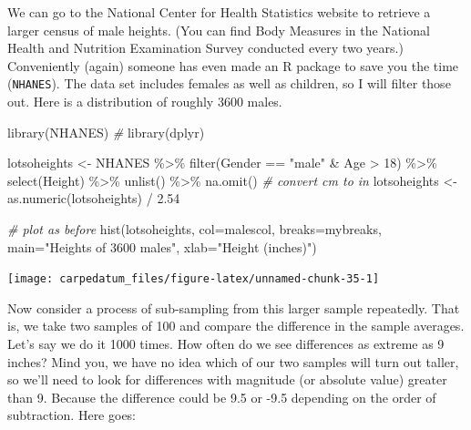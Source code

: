 \documentclass[
  openany]{book}
\newenvironment{Shaded}{\begin{snugshade}}{\end{snugshade}}
\newcommand{\AttributeTok}[1]{\textcolor[rgb]{0.77,0.63,0.00}{#1}}
\newcommand{\CommentTok}[1]{\textcolor[rgb]{0.56,0.35,0.01}{\textit{#1}}}
\newcommand{\DecValTok}[1]{\textcolor[rgb]{0.00,0.00,0.81}{#1}}
\newcommand{\FloatTok}[1]{\textcolor[rgb]{0.00,0.00,0.81}{#1}}
\newcommand{\FunctionTok}[1]{\textcolor[rgb]{0.00,0.00,0.00}{#1}}
\newcommand{\NormalTok}[1]{#1}
\newcommand{\OtherTok}[1]{\textcolor[rgb]{0.56,0.35,0.01}{#1}}
\newcommand{\SpecialCharTok}[1]{\textcolor[rgb]{0.00,0.00,0.00}{#1}}
\newcommand{\StringTok}[1]{\textcolor[rgb]{0.31,0.60,0.02}{#1}}
\begin{document}
We can go to the National Center for Health Statistics website to retrieve a larger census of male heights. (You can find Body Measures in the National Health and Nutrition Examination Survey conducted every two years.) Conveniently (again) someone has even made an R package to save you the time (\texttt{NHANES}). The data set includes females as well as children, so I will filter those out. Here is a distribution of roughly 3600 males.

\begin{Shaded}
\begin{Highlighting}[]
\FunctionTok{library}\NormalTok{(NHANES) }\CommentTok{\#}
\FunctionTok{library}\NormalTok{(dplyr)}

\NormalTok{lotsoheights }\OtherTok{\textless{}{-}}\NormalTok{ NHANES }\SpecialCharTok{\%\textgreater{}\%} \FunctionTok{filter}\NormalTok{(Gender }\SpecialCharTok{==} \StringTok{"male"} \SpecialCharTok{\&}\NormalTok{ Age }\SpecialCharTok{\textgreater{}} \DecValTok{18}\NormalTok{) }\SpecialCharTok{\%\textgreater{}\%} 
                                \FunctionTok{select}\NormalTok{(Height) }\SpecialCharTok{\%\textgreater{}\%} \FunctionTok{unlist}\NormalTok{() }\SpecialCharTok{\%\textgreater{}\%} \FunctionTok{na.omit}\NormalTok{()}
\CommentTok{\# convert cm to in}
\NormalTok{lotsoheights }\OtherTok{\textless{}{-}} \FunctionTok{as.numeric}\NormalTok{(lotsoheights) }\SpecialCharTok{/} \FloatTok{2.54}

\CommentTok{\# plot as before}
\FunctionTok{hist}\NormalTok{(lotsoheights, }\AttributeTok{col=}\NormalTok{malescol, }\AttributeTok{breaks=}\NormalTok{mybreaks, }
          \AttributeTok{main=}\StringTok{"Heights of 3600 males"}\NormalTok{, }\AttributeTok{xlab=}\StringTok{"Height (inches)"}\NormalTok{)}
\end{Highlighting}
\end{Shaded}

\begin{center}\texttt{[image: carpedatum\_files/figure-latex/unnamed-chunk-35-1]} \end{center}

Now consider a process of sub-sampling from this larger sample repeatedly. That is, we take two samples of 100 and compare the difference in the sample averages. Let's say we do it 1000 times. How often do we see differences as extreme as 9 inches? Mind you, we have no idea which of our two samples will turn out taller, so we'll need to look for differences with magnitude (or absolute value) greater than 9. Because the difference could be 9.5 or -9.5 depending on the order of subtraction. Here goes:
\end{document}

